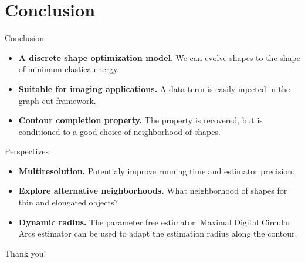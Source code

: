 \section*{Conclusion}

\begin{frame}
{Conclusion}

\begin{itemize}
\itemsep1em
\item{\textbf{A discrete shape optimization model}. We can evolve shapes to the shape of minimum elastica energy.}

\item{\textbf{Suitable for imaging applications.} A data term is easily injected in the graph cut framework.}

\item{\textbf{Contour completion property.} The property is recovered, but is conditioned to a good choice of neighborhood of shapes. }
\end{itemize}

\end{frame}

\begin{frame}
{Perspectives}

\begin{itemize}
\itemsep1em
\item{\textbf{Multiresolution.} Potentialy improve running time and estimator precision.}

\item{\textbf{Explore alternative neighborhoods.} What neighborhood of shapes for thin and elongated objects?}

\item{\textbf{Dynamic radius.} The parameter free estimator: Maximal Digital Circular Arcs estimator can be used to adapt the estimation radius along the contour.}

\end{itemize}

\end{frame}

\begin{frame}[focus]
\huge
\center
Thank you!
\end{frame}

